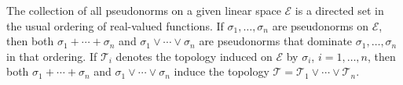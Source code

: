 The collection of all pseudonorms on a given linear space $\mathcal{E}$ is a directed set in the usual ordering of real-valued functions. If $\sigma_1, \ldots, \sigma_n$ are pseudonorms on $\mathcal{E}$, then both $\sigma_1 + \cdots + \sigma_n$ and $\sigma_1 \vee \cdots \vee \sigma_n$ are pseudonorms that dominate $\sigma_1, \ldots, \sigma_n$ in that ordering. If $\mathcal{T}_i$ denotes the topology induced on $\mathcal{E}$ by $\sigma_i$, $i = 1, \ldots, n$, then both $\sigma_1 + \cdots + \sigma_n$ and $\sigma_1 \vee \cdots \vee \sigma_n$ induce the topology $\mathcal{T} = \mathcal{T}_1 \vee \cdots \vee \mathcal{T}_n$.
